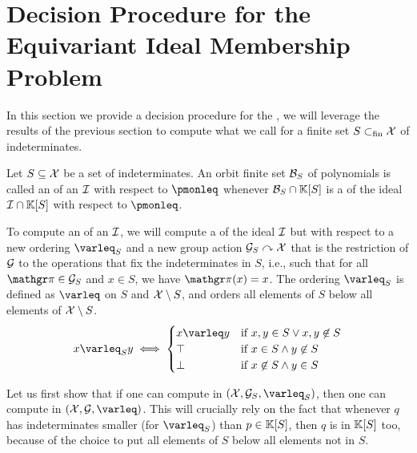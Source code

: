%
\section{Decision Procedure for the Equivariant Ideal Membership Problem}
\label{sec:algorithm}

In this section we provide a decision procedure for the , we will leverage the results of the previous section
to compute what we call  for a finite set
$S \subset_{\text{fin}} \mathcal{X}$ of indeterminates.

\begin{definition}
  \label{def:strong-equiv-grob}
  Let $S \subseteq \mathcal{X}$ be a set of indeterminates.
  An orbit finite set $\Basis_S$
  of polynomials is called an 
  of an  $\idl$ with respect to $\pmonleq$
  whenever $\Basis_S \cap \poly{\K}{S}$ is a
   of the ideal $\idl \cap \poly{\K}{S}$ with respect to
  $\pmonleq$.
\end{definition}

\AP To compute an  of an
 $\idl$, we will compute a  of the ideal $\idl$ but with respect to a new ordering $\varleq_S$ and a
new group action $\mathcal{G}_S \curvearrowright \mathcal{X}$ that is the restriction of $\mathcal{G}$ to
the operations that fix the indeterminates in $S$, i.e., such that for all
$\gelem \in \group_S$ and $x \in S$, we have $\gelem(x) = x$. The ordering
$\varleq_S$ is defined as $\varleq$ on $S$ and $\mathcal{X} \setminus S$, and orders all
elements of $S$ below all elements of $\mathcal{X} \setminus S$.
\begin{equation}
  \label{eq:order-S}
  x \varleq_S y \iff
  \begin{cases}
    x \varleq y & \text{if } x,y \in S \lor x,y \not\in S  \\
    \top        & \text{if } x \in S \land y \not\in S \\
    \bot        & \text{if } x \not\in S \land y \in S
  \end{cases}
\end{equation}

\AP Let us first show that if one can compute  in $(\X, \group_S, \varleq_S)$, then one can compute  in $(\X, \group, \varleq)$. This will crucially rely
on the fact that whenever $q$ has indeterminates smaller (for $\varleq_S$) than
$p \in \mathbb{K}[S]$, then $q$ is in $\mathbb{K}[S]$ too, because of the choice
to put all elements of $S$ below all elements not in $S$.

